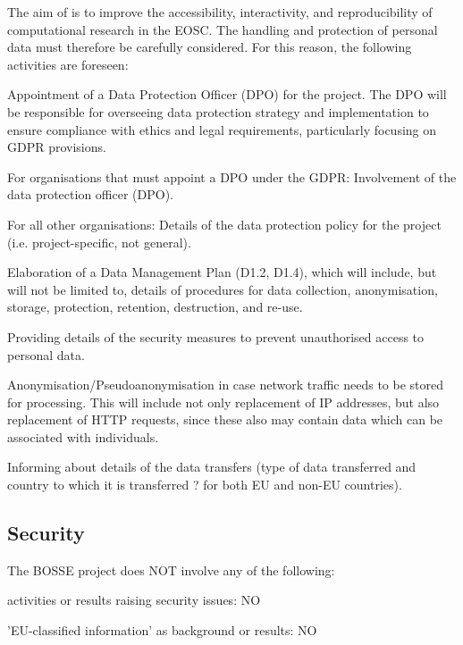 The aim of \TheProject is to improve the accessibility, interactivity, and reproducibility of computational research in the EOSC. The handling and protection of personal data must therefore be carefully considered. For this reason, the following activities are foreseen:
\begin{compactitem}
\item Appointment of a Data Protection Officer (DPO) for the project. The DPO will be responsible for overseeing data protection strategy and implementation to ensure compliance with ethics and legal requirements, particularly focusing on GDPR provisions.
\item For organisations that must appoint a DPO under the GDPR: Involvement of the data protection officer (DPO).
\item For all other organisations: Details of the data protection policy for the project (i.e. project-specific, not general). 
\item Elaboration of a Data Management Plan (D1.2, D1.4), which will include, but will not be limited to, details of procedures for data collection, anonymisation, storage, protection, retention, destruction, and re-use.
\item Providing details of the security measures to prevent unauthorised access to personal data.
\item Anonymisation/Pseudoanonymisation in case network traffic needs to be stored for processing. This will include not only replacement of IP addresses, but also replacement of HTTP requests, since these also may contain data which can be associated with individuals.
\item Informing about details of the data transfers (type of data transferred and country to which it is transferred ? for both EU and non-EU countries). 
\end{compactitem}

\subsection{Security}

The BOSSE project does NOT involve any of the following:

\begin{compactitem}
\item activities or results raising security issues: NO
\item 'EU-classified information' as background or results: NO
\end{compactitem}

